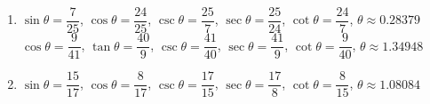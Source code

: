 \documentclass{book}
\begin{document}
\begin{appendices}
\begin{enumerate}[!HW!]
\item $\sin \theta = \dfrac{7}{25}$, $\cos \theta = \dfrac{24}{25}$, $\csc \theta  = \dfrac{25}{7}$, $\sec \theta = \dfrac{25}{24}$, $\cot \theta = \dfrac{24}{7}$, $\theta \approx 0.28379$
\itemspade $\cos \theta = \dfrac{9}{41}$, $\tan \theta = \dfrac{40}{9}$, $\csc \theta  = \dfrac{41}{40}$, $\sec \theta = \dfrac{41}{9}$, $\cot \theta = \dfrac{9}{40}$, $\theta \approx 1.34948$
\item $\sin \theta = \dfrac{15}{17}$, $\cos \theta = \dfrac{8}{17}$, $\csc \theta  = \dfrac{17}{15}$, $\sec \theta = \dfrac{17}{8}$, $\cot \theta = \dfrac{8}{15}$, $\theta \approx 1.08084$


\end{enumerate}
\end{appendices}
\end{document}
